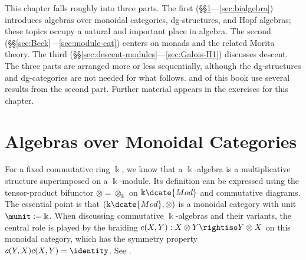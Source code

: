 \begin{petunjukbacaan}
	This chapter falls roughly into three parts. The first
	(\S\S\ref{sec:alg-in-monoidal-cat}---\ref{sec:bialgebra}) introduces
	algebras over monoidal categories, dg-structures, and Hopf algebras; these
	topics occupy a natural and important place in algebra. The second
	(\S\S\ref{sec:Beck}---\ref{sec:module-cat}) centers on monads and the
	related Morita theory. The third
	(\S\S\ref{sec:descent-modules}---\ref{sec:Galois-H1}) discusses descent.
	The three parts are arranged more or less sequentially, although the
	dg-structures and dg-categories are not needed for what follows.
	 and  of this book use several
	results from the second part. Further material appears in the exercises
	for this chapter.
\end{petunjukbacaan}

\section{Algebras over Monoidal Categories}\label{sec:alg-in-monoidal-cat}

For a fixed commutative ring $\Bbbk$, we know that a $\Bbbk$-algebra is a
multiplicative structure superimposed on a $\Bbbk$-module. Its definition can
be expressed using the tensor-product bifunctor
$\otimes=\otimes_{\Bbbk}$ on $\Bbbk\dcate{Mod}$ and commutative diagrams.
The essential point is that $(\Bbbk\dcate{Mod},\otimes)$ is a monoidal
category with unit $\munit:=\Bbbk$. When discussing commutative
$\Bbbk$-algebras and their variants, the central role is played by the
braiding $c(X,Y):X\otimes Y\rightiso Y\otimes X$ on this monoidal category,
which has the symmetry property $c(Y,X)c(X,Y)=\identity$. See
\cite[\S 7.4]{Li1}.


